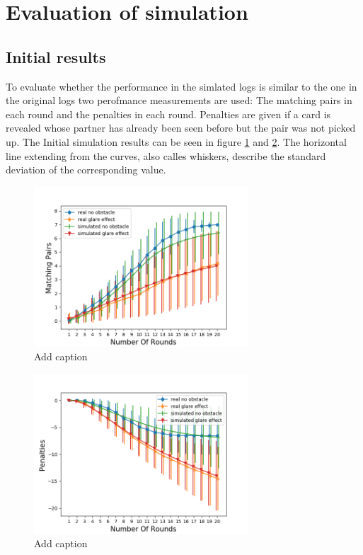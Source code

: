\section{Evaluation of simulation}
\label{evaluation_of_simulation}



\subsection{Initial results}
To evaluate whether the performance in the simlated logs is similar to the one in the original logs two perofmance measurements are used: The matching pairs in each round and the penalties in each round. Penalties are given if a card is revealed whose partner has already been seen before but the pair was not picked up. The Initial simulation results can be seen in figure \ref{fig:simIn1} and \ref{fig:simIn2}. The horizontal line extending from the curves, also calles whiskers, describe the standard deviation of the corresponding value. 

\begin{minipage}{0.5\textwidth}
	\begin{figure}[H]
		\centering
		\includegraphics[width=8cm]{images/simulationInitial1.png}
		\caption[Bild kurz]{Add caption}
		\label{fig:simIn1}
	\end{figure}
\end{minipage}
\begin{minipage}{0.5\textwidth}
	\begin{figure}[H]
		\centering
		\includegraphics[width=8cm]{images/simulationInitial2.png}
		\caption[Bild kurz]{Add caption}
		\label{fig:simIn2}
	\end{figure}
\end{minipage}

